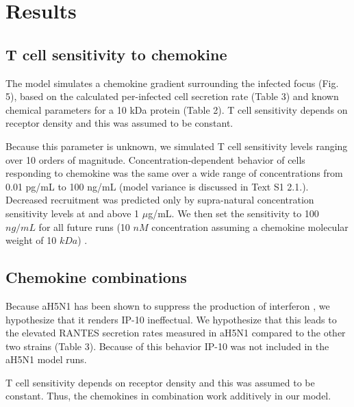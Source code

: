 \documentclass[10pt]{article}
\begin{document}


\section{Results}

\subsection*{T cell sensitivity to chemokine}

The model simulates a chemokine gradient surrounding the infected focus (Fig. 5), based on the calculated per-infected cell secretion rate (Table 3) and known chemical parameters for a 10 kDa protein (Table 2).  T cell sensitivity depends on receptor density \cite{Desmetz2006} and this was assumed to be constant.

Because this parameter is unknown, we simulated T cell sensitivity levels ranging over 10 orders of magnitude.  Concentration-dependent behavior of cells responding to chemokine was the same over a wide range of concentrations from 0.01 pg/mL to 100 ng/mL (model variance is discussed in Text S1 2.1.).  Decreased recruitment was predicted only by supra-natural concentration sensitivity levels at and above 1 $\mu$g/mL.  We then set the sensitivity to 100 $ng/mL$ for all future runs (10 $nM$ concentration assuming a chemokine molecular weight of 10 $kDa$) \cite{Gao2003}.  



\subsection{Chemokine combinations}

Because aH5N1 has been shown to suppress the production of interferon \cite{Mitchell2011}, we hypothesize that it renders IP-10 ineffectual.  We hypothesize that this leads to the elevated RANTES secretion rates measured in aH5N1 compared to the other two strains (Table 3).  Because of this behavior IP-10 was not included in the aH5N1 model runs. 

T cell sensitivity depends on receptor density \cite{Desmetz2006} and this was assumed to be constant.  Thus, the chemokines in combination work additively in our model. 
\end{document}
